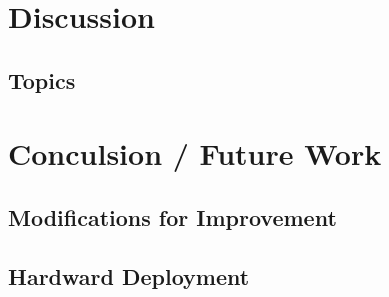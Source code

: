 \documentclass[a4paper]{article}
\begin{document}
\section{Discussion}

\subsection{Topics}

\section{Conculsion / Future Work}
\subsection{Modifications for Improvement}
\subsection{Hardward Deployment}


%
\end{document}
